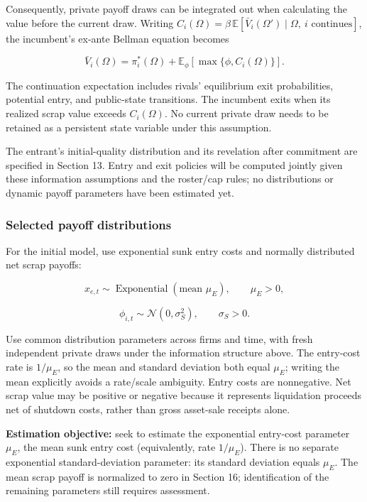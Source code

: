 \documentclass[10pt,]{article}
\begin{document}
Consequently, private payoff draws can be integrated out when
calculating the value before the current draw. Writing
\(C_i(\Omega)=\beta\,\mathbb{E}[\bar V_i(\Omega')\mid\Omega,\ i\text{ continues}]\),
the incumbent's ex-ante Bellman equation becomes

\[
\bar V_i(\Omega)=\pi_i^*(\Omega)+\mathbb{E}_{\phi}\left[\max\{\phi,C_i(\Omega)\}\right].
\]

The continuation expectation includes rivals' equilibrium exit
probabilities, potential entry, and public-state transitions. The
incumbent exits when its realized scrap value exceeds \(C_i(\Omega)\).
No current private draw needs to be retained as a persistent state
variable under this assumption.

The entrant's initial-quality distribution and its revelation after
commitment are specified in Section 13. Entry and exit policies will be
computed jointly given these information assumptions and the roster/cap
rules; no distributions or dynamic payoff parameters have been estimated
yet.

\subsubsection{Selected payoff
distributions}\label{selected-payoff-distributions}

For the initial model, use exponential sunk entry costs and normally
distributed net scrap payoffs:

\[
x_{e,t}\sim\operatorname{Exponential}(\text{mean }\mu_E),\qquad \mu_E>0,
\]

\[
\phi_{i,t}\sim\mathcal{N}(0,\sigma_S^2),\qquad \sigma_S>0.
\]

Use common distribution parameters across firms and time, with fresh
independent private draws under the information structure above. The
entry-cost rate is \(1/\mu_E\), so the mean and standard deviation both
equal \(\mu_E\); writing the mean explicitly avoids a rate/scale
ambiguity. Entry costs are nonnegative. Net scrap value may be positive
or negative because it represents liquidation proceeds net of shutdown
costs, rather than gross asset-sale receipts alone.

\textbf{Estimation objective:} seek to estimate the exponential
entry-cost parameter \(\mu_E\), the mean sunk entry cost (equivalently,
rate \(1/\mu_E\)). There is no separate exponential standard-deviation
parameter: its standard deviation equals \(\mu_E\). The mean scrap
payoff is normalized to zero in Section 16; identification of the
remaining parameters still requires assessment.
\end{document}
